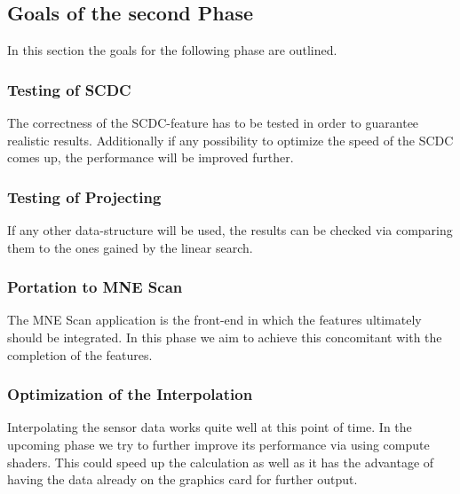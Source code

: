\subsection{Goals of the second Phase}
In this section the goals for the following phase are outlined. 

\subsubsection{Testing of SCDC}
The correctness of the SCDC-feature has to be tested in order to guarantee realistic results. Additionally if any possibility to optimize the speed of the SCDC comes up, the performance will be improved further.
\subsubsection{Testing of Projecting}
If any other data-structure will be used, the results can be checked via comparing them to the ones gained by the linear search.
\subsubsection{Portation to MNE Scan}
The MNE Scan application is the front-end in which the features ultimately should be integrated. In this phase we aim to achieve this concomitant with the completion of the features.
\subsubsection{Optimization of the Interpolation}
Interpolating the sensor data works quite well at this point of time. In the upcoming phase we try to further improve its performance via using compute shaders. This could speed up the calculation as well as it has the advantage of having the data already on the graphics card for further output.